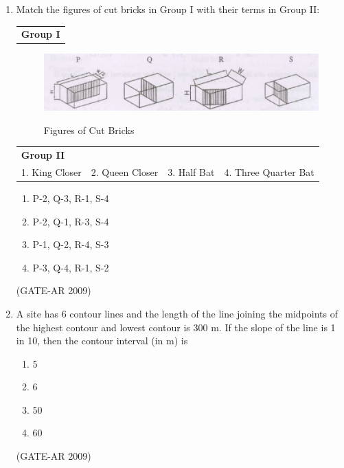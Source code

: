 \documentclass[a4paper,10pt]{article}
\begin{document}
\begin{enumerate}
    \item Match the figures of cut bricks in Group I with their terms in Group II:  \\
    \begin{tabular}{ l }
	\textbf{Group I} \\
	\end{tabular}
	\begin{figure}[h!]
        \centering
        \includegraphics[width=0.5\linewidth]{figs/img_01.jpg}
        \label{fig:Img01}
	\caption{Figures of Cut Bricks}
	\end{figure}
    \begin{tabular}{ l l l l }
	\textbf{Group II} & & & \\
	1. King Closer & 2. Queen Closer & 3. Half Bat & 4. Three Quarter Bat \\
	\end{tabular}
	\begin{multicols}{2}
	\begin{enumerate}
        \item P-2, Q-3, R-1, S-4
        \item P-2, Q-1, R-3, S-4
        \item P-1, Q-2, R-4, S-3
        \item P-3, Q-4, R-1, S-2
    \end{enumerate}
	\end{multicols}
    \hfill (GATE-AR 2009)

    \item A site has 6 contour lines and the length of the line joining the midpoints of the highest contour and lowest contour is 300 m. If the slope of the line is 1 in 10, then the contour interval (in m) is 
    \begin{multicols}{4}
	\begin{enumerate}
        \item 5
        \item 6
        \item 50
        \item 60
    \end{enumerate}
	\end{multicols}
    \hfill (GATE-AR 2009)
	

\end{enumerate}
\end{document}

